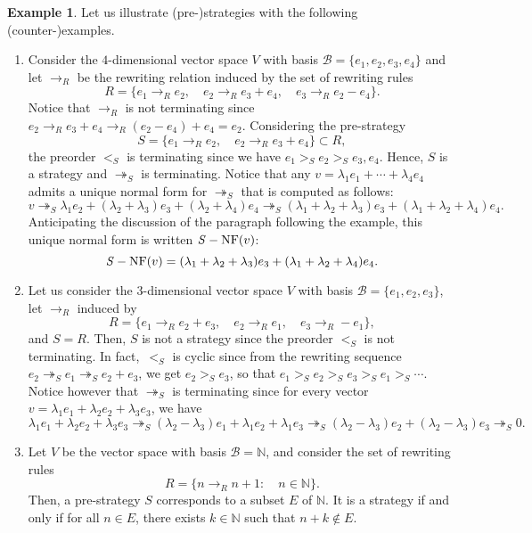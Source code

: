 \documentclass[11pt]{article}
\theoremstyle{definition}
\newtheorem{example}[theorem]{Example}
\newcommand\basis{\mathscr{B}}
\newcommand\ordS{<_S}
\newcommand\N{\mathbb{N}}
\newcommand\rewR{\to_R}
\newcommand\parS{\twoheadrightarrow_S}
\DeclareMathOperator{\SNF}{{\it S}-NF}
\begin{document}
\begin{example}\label{ex:strategies_step_1}
  Let us illustrate (pre-)strategies with the following
  (counter-)examples.
  \begin{enumerate}
  \item\label{it:ex_strat_1} Consider the $4$-dimensional vector space
    $V$ with basis $\basis=\{e_1,e_2,e_3,e_4\}$ and let $\rewR$ be the
    rewriting relation induced by the set of rewriting rules
    \[R=\{e_1\rewR e_2,\quad e_2\rewR e_3+e_4,\quad e_3\rewR e_2-e_4\}.\]
    Notice that $\rewR$ is not terminating since
    $e_2\rewR e_3+e_4\rewR(e_2-e_4)+e_4=e_2$. Considering the
    pre-strategy
    \[S=\{e_1\rewR e_2,\quad e_2\rewR e_3+e_4\}\subset R,\]
    the preorder $\ordS$ is terminating since we have
    $e_1>_Se_2>_Se_3,e_4$. Hence, $S$ is a strategy and $\parS$ is
    terminating. Notice that any $v=\lambda_1e_1+\cdots+\lambda_4e_4$ 
    admits a unique normal form for $\parS$ that is computed as follows:
    \[v\parS\lambda_1e_2+(\lambda_2+\lambda_3)e_3+
    (\lambda_2+\lambda_4)e_4\parS(\lambda_1+\lambda_2+\lambda_3)e_3+
    (\lambda_1+\lambda_2+\lambda_4)e_4.\]
    Anticipating the discussion of the paragraph following the example,
    this unique normal form is written $\SNF(v)$:
    \[\SNF(v)=(\lambda_1+\lambda_2+\lambda_3)e_3+
    (\lambda_1+\lambda_2+\lambda_4)e_4.\]
  \item\label{it:c-ex_strat_1} Let us consider the $3$-dimensional vector
    space $V$ with basis $\basis=\{e_1,e_2,e_3\}$, let $\rewR$ induced by
    \[R=\{e_1\rewR e_2+e_3,\quad e_2\rewR e_1,\quad e_3\rewR -e_1\},\]
    and $S=R$. Then, $S$ is not a strategy since the preorder $\ordS$ is
    not terminating. In fact,~$\ordS$ is cyclic since from the rewriting
    sequence $e_2\parS e_1\parS e_2+e_3$, we get $e_2>_Se_3$, so that
    $e_1>_S e_2>_S e_3>_S e_1>_S\cdots$. Notice however that $\parS$ is
    terminating since for every vector 
    $v=\lambda_1e_1+\lambda_2e_2+\lambda_3e_3$, we have
    \[\lambda_1e_1+\lambda_2e_2+\lambda_3e_3\parS(\lambda_2-\lambda_3)e_1
    +\lambda_1e_2+\lambda_1e_3\parS(\lambda_2-\lambda_3)e_2+(\lambda_2-
    \lambda_3)e_3\parS 0.
    \]
  \item\label{it:case_N} Let $V$ be the vector space with basis
    $\basis= \mathbb N$, and consider the set of rewriting rules
    \[R=\{n\rewR n+1:\quad n\in\N\}.\]
    Then, a pre-strategy $S$ corresponds to a subset $E$ of $\mathbb N$.
    It is a strategy if and only if for all $n \in E$, there exists
    $k \in \mathbb N$ such that $n + k \notin E$. 
  \end{enumerate}
\end{example}
\smallskip
\end{document}
